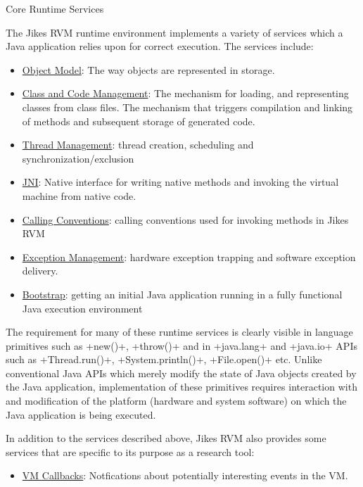 \begin{section}{Core Runtime Services}
\label{sec:coreruntimeservices}

The Jikes RVM runtime environment implements a variety of services which a Java application relies upon for correct execution. The services include:

\begin{itemize}
  \item \hyperref[sec:objectmodel]{Object Model}: The way objects are represented in storage.
  \item \hyperref[sec:classandcodemanagement]{Class and Code Management}: The mechanism for loading, and representing classes from class files. The mechanism that triggers compilation and linking of methods and subsequent storage of generated code.
  \item \hyperref[sec:threadmanagement]{Thread Management}: thread creation, scheduling and synchronization/exclusion
  \item \hyperref[sec:jni]{JNI}: Native interface for writing native methods and invoking the virtual machine from native code.
  \item \hyperref[sec:callingconventions]{Calling Conventions}: calling conventions used for invoking methods in Jikes RVM
  \item \hyperref[sec:exceptionmanagement]{Exception Management}: hardware exception trapping and software exception delivery.
  \item \hyperref[sec:bootstrap]{Bootstrap}: getting an initial Java application running in a fully functional Java execution environment
\end{itemize}

The requirement for many of these runtime services is clearly visible in language primitives such as \spverb+new()+, \spverb+throw()+ and in \spverb+java.lang+ and \spverb+java.io+ APIs such as \spverb+Thread.run()+, \spverb+System.println()+, \spverb+File.open()+ etc. Unlike conventional Java APIs which merely modify the state of Java objects created by the Java application, implementation of these primitives requires interaction with and modification of the platform (hardware and system software) on which the Java application is being executed.

In addition to the services described above, Jikes RVM also provides some services that are specific to its purpose as 
a research tool:
\begin{itemize}
  \item \hyperref[sec:vmcallbacks]{VM Callbacks}: Notfications about potentially interesting events in the VM.
\end{itemize}

\end{section}

